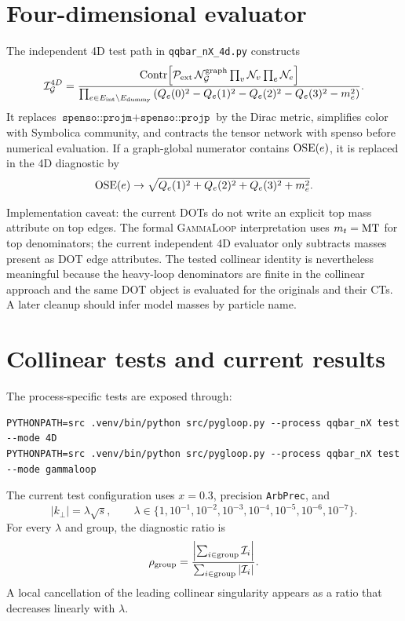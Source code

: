\documentclass[11pt]{article}
\newcommand{\GammaLoop}{\textsc{GammaLoop}}
\newcommand{\I}{\mathcal{I}}
\begin{document}
\section{Four-dimensional evaluator}

The independent 4D test path in \texttt{qqbar\_nX\_4d.py} constructs
\[
  \I_{\mathcal G}^{4D}
  =
  \frac{
    {\rm Contr}\!\left[
      {\cal P}_{\rm ext}\,
      {\cal N}_{\mathcal G}^{\rm graph}
      \prod_v{\cal N}_v
      \prod_e{\cal N}_e
    \right]
  }{
    \prod_{e\in E_{\rm int}\setminus E_{\rm dummy}}
    \left(Q_e(0)^2-Q_e(1)^2-Q_e(2)^2-Q_e(3)^2-m_e^2\right)
  }.
  \label{eq:fourDEvaluator}
\]
It replaces \(\texttt{spenso::projm}+\texttt{spenso::projp}\) by the Dirac
metric, simplifies color with Symbolica community, and contracts the tensor
network with spenso before numerical evaluation.  If a graph-global numerator
contains \({\rm OSE}(e)\), it is replaced in the 4D diagnostic by
\[
  {\rm OSE}(e)\to
  \sqrt{Q_e(1)^2+Q_e(2)^2+Q_e(3)^2+m_e^2}.
\]

Implementation caveat: the current DOTs do not write an explicit top mass
attribute on top edges.  The formal \GammaLoop{} interpretation uses
\(m_t={\rm MT}\) for top denominators; the current independent 4D evaluator
only subtracts masses present as DOT edge attributes.  The tested collinear
identity is nevertheless meaningful because the heavy-loop denominators are
finite in the collinear approach and the same DOT object is evaluated for the
originals and their CTs.  A later cleanup should infer model masses by
particle name.

\section{Collinear tests and current results}

The process-specific tests are exposed through:
\begin{lstlisting}
PYTHONPATH=src .venv/bin/python src/pygloop.py --process qqbar_nX test --mode 4D
PYTHONPATH=src .venv/bin/python src/pygloop.py --process qqbar_nX test --mode gammaloop
\end{lstlisting}
The current test configuration uses \(x=0.3\), precision
\texttt{ArbPrec}, and
\[
  |k_\perp|=\lambda\sqrt{s},
  \qquad
  \lambda\in\{1,10^{-1},10^{-2},10^{-3},10^{-4},10^{-5},10^{-6},10^{-7}\}.
\]
For every \(\lambda\) and group, the diagnostic ratio is
\[
  \rho_{\rm group}
  =
  \frac{\left|\sum_{i\in{\rm group}}\I_i\right|}
       {\sum_{i\in{\rm group}}|\I_i|}.
\]
A local cancellation of the leading collinear singularity appears as a ratio
that decreases linearly with \(\lambda\).
\end{document}
